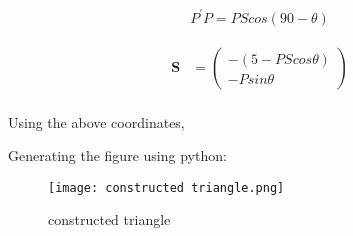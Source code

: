 \documentclass[a4paper,12pt,two column]{article}
\theoremstyle{remark}
\newcommand{\myvec}[1]{\ensuremath{\begin{pmatrix}#1\end{pmatrix}}}
\let\vec\mathbf
\begin{document}
\begin{align}
    P^\prime P = PS cos(90-\theta)
\end{align}    

\begin{align}
    \vec{S} &=\myvec{-(5 - PS cos\theta) \\ -Psin\theta}\\
\end{align}

Using the above coordinates,

Generating the figure using python:

\begin{figure}[bht]
    \centering
    \texttt{[image: constructed triangle.png]}
    \caption{constructed triangle}
    \label{fig:my_label}
\end{figure}
\end{document}
